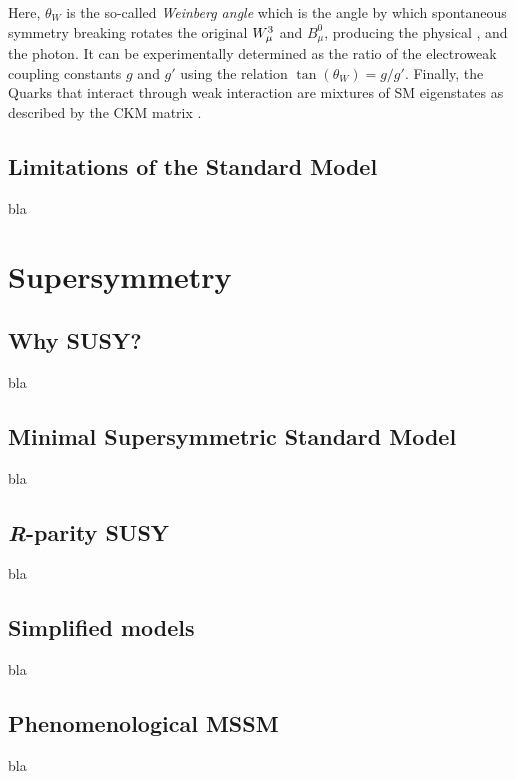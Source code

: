 				Here, $\theta_W$ is the so-called \emph{Weinberg angle} which is the angle by which spontaneous symmetry breaking rotates the original $W_{\mu}^3$ and $B_{\mu}^0$, producing the physical \Zboson, and the photon. It can be experimentally determined as the ratio of the electroweak coupling constants $g$ and $g'$ using the relation $\tan(\theta_W) = g / g'$. Finally, the Quarks that interact through weak interaction are mixtures of SM eigenstates as described by the CKM matrix \cite{Olive2014}.







		\subsection{Limitations of the Standard Model}
		\label{sec:SMlim}
		
			bla





	\section{Supersymmetry}
	\label{sec:SUSY}

		\subsection{Why SUSY?}
			
			bla

		\subsection{Minimal Supersymmetric Standard Model}
			
			bla

		\subsection{\emph{R}-parity SUSY}
		
			bla

		\subsection{Simplified models}
		
			bla


		\subsection{Phenomenological MSSM}
		
			bla

